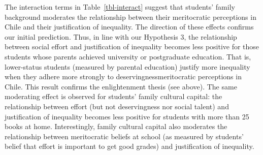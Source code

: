 \documentclass[
  letterpaper,
  DIV=11,
  numbers=noendperiod]{scrartcl}
\begin{document}
\hypertarget{tbl-interact}{}
\begin{table}[H]
\caption{\label{tbl-interact}Interactions effects }\tabularnewline

\centering
{}
\end{table}

The interaction terms in Table~\ref{tbl-interact} suggest that students'
family background moderates the relationship between their meritocratic
perceptions in Chile and their justification of inequality. The
direction of these effects confirms our initial prediction. Thus, in
line with our Hypothesis 3, the relationship between social effort and
justification of inequality becomes less positive for those students
whose parents achieved university or postgraduate education. That is,
lower-status students (measured by parental education) justify more
inequality when they adhere more strongly to deservingnessmeritocratic
perceptions in Chile. This result confirms the enlightenment thesis (see
above). The same moderating effect is observed for students' family
cultural capital: the relationship between effort (but not deservingness
nor social talent) and justification of inequality becomes less positive
for students with more than 25 books at home. Interestingly, family
cultural capital also moderates the relationship between meritocratic
beliefs at school (as measured by students' belief that effort is
important to get good grades) and justification of inequality.
\end{document}
